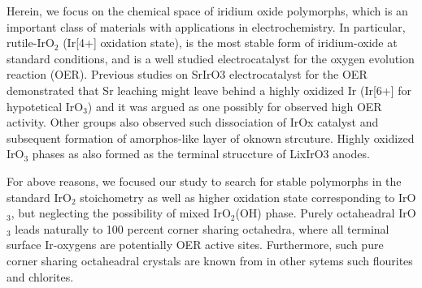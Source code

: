 




Herein, we focus on the chemical space of iridium oxide polymorphs,
which is an important class of materials with applications in electrochemistry. In particular, rutile-IrO$_2$ (Ir[4+] oxidation state), is the most stable form of iridium-oxide at standard conditions, and is a well studied electrocatalyst for the oxygen evolution reaction (OER).\cite{like 5 papers here pls}
Previous studies on SrIrO3 electrocatalyst for the OER demonstrated that Sr leaching might leave behind a highly oxidized Ir (Ir[6+] for hypotetical IrO$_3$) and it was argued as one possibly for observed high OER activity.\cite{Dickens} Other groups also observed such dissociation of IrOx catalyst and subsequent formation of amorphos-like layer of oknown strcuture\cite{Schlogl, beta-IrO3 OER paper}. Highly oxidized IrO$_3$ phases as also formed as the terminal struccture of LixIrO3 anodes.\cite{betaIrO3}

For above reasons, we focused our study to search for stable polymorphs in the standard IrO$_2$ stoichometry as well as higher oxidation state corresponding to IrO$_3$, but neglecting the possibility of mixed IrO$_2$(OH) phase.
Purely octaheadral IrO$_3$ leads naturally  to 100 percent corner sharing octahedra, where all terminal surface Ir-oxygens are potentially OER active sites. Furthermore, such pure corner sharing octaheadral crystals are known from in other sytems such flourites and chlorites. 

